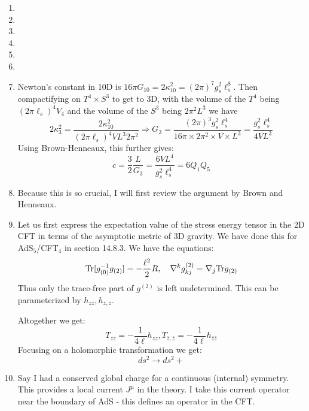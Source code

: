 \documentclass[11pt, class=article, crop=false]{standalone}
\begin{document}
\begin{enumerate}
	For arbitrary local field theories in \emph{finite volume}, this argument generalizes to show that there can never be a phase transition, since tunneling from one minimum to another only costs finite action (energy). Note, however, that this argument does not commute with taking a large $N$ limit $N \to \infty$, which is what is encountered in the text. 
	
	\item 
	
	\item 
	
	\item 
	
	\item 
	
	\item 
	
	\item 
	
	\item Newton's constant in 10D is $16\pi G_{10} = 2 \kappa_{10}^2 = (2\pi)^7 g_s^2 \ell_s^8$. Then compactifying on $T^4 \times S^3$ to get to 3D, with the volume of the $T^4$ being $(2\pi \ell_s)^4 V_4$ and the volume of the $S^3$ being $2 \pi^2 L^3$ we have
	\[
		2 \kappa_{3}^2 = \frac{2 \kappa_{10}^2}{(2 \pi \ell_s)^4 V L^3 2 \pi^2} \Rightarrow G_3 = \frac{(2\pi)^3 g_s^2 \ell_s^4}{16 \pi \times 2 \pi^2 \times V \times L^3} = \frac{g_s^2 \ell_s^4}{4 V L^3}
	\]
	Using Brown-Henneaux, this further gives:
	\[
		c = \frac32 \frac{L}{G_3} = \frac{6 V L^4}{g_s^2 \ell_s^4} = 6 Q_1 Q_5
	\]
	\item Because this is so crucial, I will first review the argument by Brown and Henneaux. 
	
	\item Let us first express the expectation value of the stress energy tensor in the 2D CFT in terms of the asymptotic metric of 3D gravity. We have done this for AdS$_5$/CFT$_4$ in section 14.8.3. We have the equations:
	\[
		\mathrm{Tr} [g_{(0)}^{-1} g_{(2)}] = - \frac{\ell^2}{2} R, \quad \nabla^k g_{kj}^{(2)} = \nabla_j \mathrm{Tr} g_{(2)}
	\]
	Thus only the trace-free part of $g^{(2)}$ is left undetermined. This can be parameterized by $h_{zz}, h_{\bar z, \bar z}$.
	
	
	Altogether we get:
	\[
		T_{zz} = - \frac{1}{4 \ell} h_{zz}, T_{\bar z, \bar z} = - \frac{1}{4 \ell} h_{\bar z \bar z}
	\]
	Focusing on a holomorphic transformation we get:
	\[
		ds^2 \to ds^2 + 
	\]
	
	
	\item 
	Say I had a conserved global charge for a continuous (internal) symmetry. This provides a local current $J^\mu$ in the theory. I take this current operator near the boundary of AdS - this defines an operator in the CFT. 
	

\end{enumerate}
\end{document}
